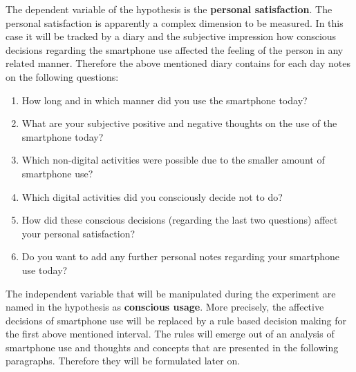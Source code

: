 \documentclass[11pt,letterpaper]{article}
\begin{document}
The dependent variable of the hypothesis is the \textbf{personal satisfaction}. The personal satisfaction is apparently a complex dimension to be measured. In this case it will be tracked by a diary and the subjective impression how conscious decisions regarding the smartphone use affected the feeling of the person in any related manner. Therefore the above mentioned diary contains for each day notes on the following questions:
\begin{enumerate}
\item 
How long and in which manner did you use the smartphone today?

\item
What are your subjective positive and negative thoughts on the use of the smartphone today?

\item
Which non-digital activities were possible due to the smaller amount of smartphone use?

\item
Which digital activities did you consciously decide not to do?

\item
How did these conscious decisions (regarding the last two questions) affect your personal satisfaction?

\item
Do you want to add any further personal notes regarding your smartphone use today?

\end{enumerate}

The independent variable that will be manipulated during the experiment are named in the hypothesis as \textbf{conscious usage}. More precisely, the affective decisions of smartphone use will be replaced by a rule based decision making for the first above mentioned interval. The rules will emerge out of an analysis of smartphone use and thoughts and concepts that are presented in the following paragraphs. Therefore they will be formulated later on.
\end{document}
